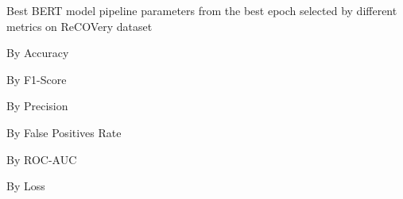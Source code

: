 \begin{table}[!htbp]
    \caption{Best BERT model pipeline parameters from the best epoch selected by different metrics on ReCOVery dataset}
    \label{tab:recovery_bert_pipeline_params}
    \centering

    \begin{subtable}[t]{0.48\linewidth}
        \scriptsize
        \caption{By Accuracy}
        
    \end{subtable}
    \hfill
    \begin{subtable}[t]{0.48\linewidth}
        \scriptsize
        \caption{By F1-Score}
        
    \end{subtable}

    \vspace{1em}

    \begin{subtable}[t]{0.48\linewidth}
        \scriptsize
        \caption{By Precision}
        
    \end{subtable}
    \hfill
    \begin{subtable}[t]{0.48\linewidth}
        \scriptsize
        \caption{By False Positives Rate}
        
    \end{subtable}

    \vspace{1em}

    \begin{subtable}[t]{0.48\linewidth}
        \scriptsize
        \caption{By ROC-AUC}
        
    \end{subtable}
    \hfill
    \begin{subtable}[t]{0.48\linewidth}
        \scriptsize
        \caption{By Loss}
        
    \end{subtable}

\end{table}